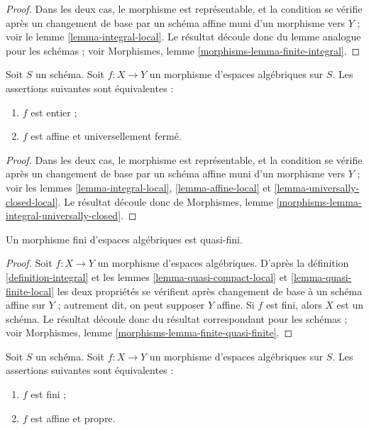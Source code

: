 \begin{proof}
Dans les deux cas, le morphisme est représentable, et la condition se vérifie
après un changement de base par un schéma affine muni d'un morphisme vers $Y$ ; voir le
lemme \ref{lemma-integral-local}. Le résultat découle donc du
lemme analogue pour les schémas ; voir
Morphismes, lemme \ref{morphisms-lemma-finite-integral}.
\end{proof}

\begin{lemma}
\label{lemma-integral-universally-closed}
Soit $S$ un schéma.
Soit $f : X \to Y$ un morphisme d'espaces algébriques sur $S$.
Les assertions suivantes sont équivalentes :
\begin{enumerate}
\item $f$ est entier ;
\item $f$ est affine et universellement fermé.
\end{enumerate}
\end{lemma}

\begin{proof}
Dans les deux cas, le morphisme est représentable, et la condition se vérifie
après un changement de base par un schéma affine muni d'un morphisme vers $Y$ ; voir les
lemmes \ref{lemma-integral-local},
\ref{lemma-affine-local} et
\ref{lemma-universally-closed-local}.
Le résultat découle donc de
Morphismes, lemme \ref{morphisms-lemma-integral-universally-closed}.
\end{proof}

\begin{lemma}
\label{lemma-finite-quasi-finite}
Un morphisme fini d'espaces algébriques est quasi-fini.
\end{lemma}

\begin{proof}
Soit $f : X \to Y$ un morphisme d'espaces algébriques.
D'après la
définition \ref{definition-integral}
et les
lemmes \ref{lemma-quasi-compact-local} et
\ref{lemma-quasi-finite-local}
les deux propriétés se vérifient après changement de base à un schéma affine sur $Y$ ;
autrement dit, on peut supposer $Y$ affine.
Si $f$ est fini, alors $X$ est un schéma.
Le résultat découle donc du résultat correspondant pour les schémas ; voir
Morphismes, lemme \ref{morphisms-lemma-finite-quasi-finite}.
\end{proof}

\begin{lemma}
\label{lemma-finite-proper}
Soit $S$ un schéma. Soit $f : X \to Y$ un morphisme d'espaces algébriques sur
$S$. Les assertions suivantes sont équivalentes :
\begin{enumerate}
\item $f$ est fini ;
\item $f$ est affine et propre.
\end{enumerate}
\end{lemma}

